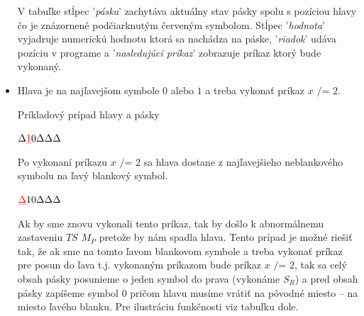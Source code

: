 \documentclass[11pt,a4paper]{article}
\newcommand{\red}[1]{\textcolor{red}{#1}}
\begin{document}
\begin{itemize}
\begin{flushright}
\begin{minipage}{0.90\textwidth}
            V tabuľke stĺpec '\textit{páska}' zachytáva aktuálny stav pásky spolu s pozíciou hlavy čo je znázornené podčiarknutým červeným symbolom. Stĺpec '\textit{hodnota}' vyjadruje numerickú hodnotu ktorá sa nachádza na páske, '\textit{riadok}' udáva pozíciu v programe a '\textit{nasledujúci príkaz}' zobrazuje príkaz ktorý bude vykonaný.
        \end{minipage}
        \end{flushright}
    \item Hlava je na najľavejšom symbole $0$ alebo $1$ a treba vykonať príkaz $x \texttt{ /= } 2$.\\[-1.5em]
        \begin{flushright}
        \begin{minipage}{0.90\textwidth}
            Príkladový prípad hlavy a pásky

            \begin{center}
                $\Delta \red{\underbar{1}} 0 \Delta \Delta \Delta$
            \end{center}

            Po vykonaní príkazu $x \texttt{ /= } 2$ sa hlava dostane z najľavejšieho neblankového symbolu na ľavý blankový symbol.

            \begin{center}
                $\red{\underbar{$\Delta$}} 1 0 \Delta \Delta \Delta$
            \end{center}

            Ak by sme znovu vykonali tento príkaz, tak by došlo k abnormálnemu zastaveniu $TS$ $M_P$ pretože by nám spadla hlava. Tento prípad je možné riešiť tak, že ak sme na tomto ľavom blankovom symbole a treba vykonať príkaz pre posun do ľava t.j. vykonaným príkazom bude príkaz $x \texttt{ /= } 2$, tak sa celý obsah pásky posunieme o jeden symbol do prava (vykonáme $S_R$) a pred obsah pásky zapíšeme symbol $0$ pričom hlavu musíme vrátiť na pôvodné miesto -- na miesto ľavého blanku. Pre ilustráciu funkčnosti viz tabuľku dole.


\end{minipage}
\end{flushright}
\end{itemize}
\end{document}
